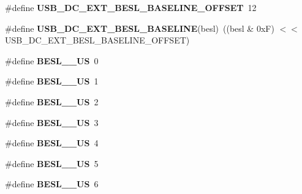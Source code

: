 \begin{DoxyCompactItemize}
\item 
\hypertarget{group__usb__protocol__group_ga4a366b00b11cb9e6479eda3b9f218038}{\#define {\bfseries U\-S\-B\-\_\-\-D\-C\-\_\-\-E\-X\-T\-\_\-\-B\-E\-S\-L\-\_\-\-B\-A\-S\-E\-L\-I\-N\-E\-\_\-\-O\-F\-F\-S\-E\-T}~12}\label{group__usb__protocol__group_ga4a366b00b11cb9e6479eda3b9f218038}

\item 
\hypertarget{group__usb__protocol__group_gacf2fe37cc6747bffe193e3008488f32f}{\#define {\bfseries U\-S\-B\-\_\-\-D\-C\-\_\-\-E\-X\-T\-\_\-\-B\-E\-S\-L\-\_\-\-B\-A\-S\-E\-L\-I\-N\-E}(besl)~((besl \& 0x\-F) $<$$<$ U\-S\-B\-\_\-\-D\-C\-\_\-\-E\-X\-T\-\_\-\-B\-E\-S\-L\-\_\-\-B\-A\-S\-E\-L\-I\-N\-E\-\_\-\-O\-F\-F\-S\-E\-T)}\label{group__usb__protocol__group_gacf2fe37cc6747bffe193e3008488f32f}

\item 
\hypertarget{group__usb__protocol__group_gafd426fc3eeec36a4c18168cf7d287a05}{\#define {\bfseries B\-E\-S\-L\-\_\-\_\-\-U\-S}~0}\label{group__usb__protocol__group_gafd426fc3eeec36a4c18168cf7d287a05}

\item 
\hypertarget{group__usb__protocol__group_ga3a0c17e729eb662f18be74d088a7cdd9}{\#define {\bfseries B\-E\-S\-L\-\_\-\_\-\-U\-S}~1}\label{group__usb__protocol__group_ga3a0c17e729eb662f18be74d088a7cdd9}

\item 
\hypertarget{group__usb__protocol__group_gac2659813cc32ca3d1a73ee7bfd1fa6da}{\#define {\bfseries B\-E\-S\-L\-\_\-\_\-\-U\-S}~2}\label{group__usb__protocol__group_gac2659813cc32ca3d1a73ee7bfd1fa6da}

\item 
\hypertarget{group__usb__protocol__group_ga82f10935a972500a5f43573b472b1d9e}{\#define {\bfseries B\-E\-S\-L\-\_\-\_\-\-U\-S}~3}\label{group__usb__protocol__group_ga82f10935a972500a5f43573b472b1d9e}

\item 
\hypertarget{group__usb__protocol__group_gaaba0d09ec3820e36f541cd43e20d2dff}{\#define {\bfseries B\-E\-S\-L\-\_\-\_\-\-U\-S}~4}\label{group__usb__protocol__group_gaaba0d09ec3820e36f541cd43e20d2dff}

\item 
\hypertarget{group__usb__protocol__group_ga0bd30af2c8965b7638b6c049d1fae731}{\#define {\bfseries B\-E\-S\-L\-\_\-\_\-\-U\-S}~5}\label{group__usb__protocol__group_ga0bd30af2c8965b7638b6c049d1fae731}

\item 
\hypertarget{group__usb__protocol__group_ga5f9c8ec8522c0a8991decaef00979e6b}{\#define {\bfseries B\-E\-S\-L\-\_\-\_\-\-U\-S}~6}\label{group__usb__protocol__group_ga5f9c8ec8522c0a8991decaef00979e6b}


\end{DoxyCompactItemize}
